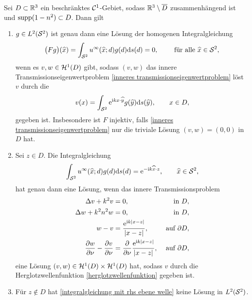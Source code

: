 \begin{satz}\label{satz: lösungen der (in)homogenen integralgleichungen}
	Sei \(D\subset\mathbb{R}^3\) ein beschränktes \(\mathcal{C}^1\)-Gebiet, sodass \(\mathbb{R}^3\setminus\overline{D}\) zusammenhängend ist und \(\operatorname{supp}(1-n^2)\subset D\). Dann gilt
	\begin{enumerate}[label=(\alph*)]
		\item\label{satz: lösungen der (in)homogenen integralgleichungen: a} \(g\in L^2(\mathcal{S}^2)\) ist genau dann eine Lösung der homogenen Integralgleichung
		\begin{equation}
			\label{homogene integralgleichung}
			\big(Fg\big)(\widehat{x})=\int_{\mathcal{S}^2}u^\infty(\widehat{x};d)g(d)\mathrm{d}s(d)=0,\qquad\text{ für alle }\widehat{x}\in\mathcal{S}^2,
		\end{equation}
		wenn es \(v,w\in\mathcal{H}^1(D)\) gibt, sodass \((v,w)\) das innere Transmissionseigenwertproblem \eqref{inneres transmissionseigenwertproblem} löst  \(v\) durch die 
		\begin{equation}
			\label{herglotzwellenfunktion}
			v(x)=\int_{\mathcal{S}^2}\mathrm{e}^{\mathrm{i} kx\cdot \widehat{y}}g(\widehat{y})\mathrm{d}s(\widehat{y}),\qquad x\in D,
		\end{equation}
		gegeben ist. Insbesondere ist \(F\) injektiv, falls \eqref{inneres transmissionseigenwertproblem} nur die triviale Lösung \((v,w)=(0,0)\) in \(D\) hat.
		
		\item\label{satz: lösungen der (in)homogenen integralgleichungen: b} Sei \(z\in D\). Die Integralgleichung
		\begin{equation}
			\label{integralgleichung mit rhs ebene welle}
			\int_{\mathcal{S}^2}u^\infty(\widehat{x};d)g(d)\mathrm{d}s(d)=\mathrm{e}^{-\mathrm{i} k\widehat{x}\cdot z},\qquad \widehat{x}\in\mathcal{S}^2,
		\end{equation}
		hat genau dann eine Lösung, wenn das innere Transmissionsproblem
		\begin{equation}
			\label{inneres transmissionsproblem mit expliziter rhs}
			\begin{aligned}
				\Delta v+k^2v&=0,&\text{ in }D,\\
				\Delta w+k^2n^2w&=0,&\text{ in }D,\\
				w-v&=\frac{\mathrm{e}^{\mathrm{i} k|x-z|}}{|x-z|},&\text{ auf }\partial D,\\
				\frac{\partial w}{\partial\nu}-\frac{\partial v}{\partial\nu}&=\frac{\partial}{\partial\nu}\frac{\mathrm{e}^{\mathrm{i} k|x-z|}}{|x-z|},&\text{ auf }\partial D,
			\end{aligned}
		\end{equation}
		eine Lösung \((v,w)\in\mathcal{H}^1(D)\times\mathcal{H}^1(D)\) hat, sodass \(v\) durch die Herglotzwellenfunktion \eqref{herglotzwellenfunktion} gegeben ist.
		
		\item\label{satz: lösungen der (in)homogenen integralgleichungen: c} Für \(z\notin D\) hat \eqref{integralgleichung mit rhs ebene welle} keine Lösung in \(L^2(\mathcal{S}^2)\).
	\end{enumerate}\vspace{25mm}
\end{satz}

